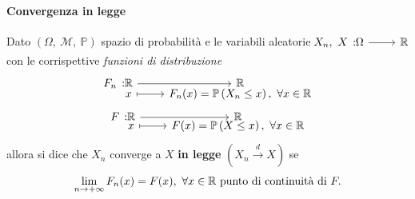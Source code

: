 \paragraph{Convergenza in legge}
\begin{define}
	Dato $\left(\Omega,\ \mathcal{M},\ \mathbb{P}\right)$ spazio di probabilità e le variabili aleatorie $\funz{X_n,\ X}{\Omega}{\realset}$ con le corrispettive \textit{funzioni di distribuzione}
	\begin{gather*}
		\funztot{F_n}{\realset}{\realset}{x}{F_n(x)=\mathbb{P}\left(X_n\leq x\right),\ \forall x\in \realset}\\
		\funztot{F}{\realset}{\realset}{x}{F(x)=\mathbb{P}\left(X\leq x\right),\ \forall x\in \realset}
	\end{gather*}
	allora si dice che $X_n$ converge a $X$ \textbf{in legge} $\left(X_n\stackrel{d}{\to}X\right)$ se
	\begin{equation}
		\lim_{n\to+\infty}F_n(x)=F(x),\ \forall x\in\mathbb{R}\ \text{punto di continuità di }F.
	\end{equation}
\end{define}